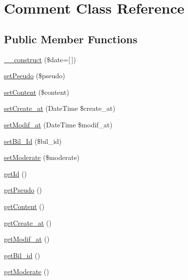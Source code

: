 \hypertarget{class_src_1_1_entity_1_1_comment}{}\section{Comment Class Reference}
\label{class_src_1_1_entity_1_1_comment}
\subsection*{Public Member Functions}
\begin{DoxyCompactItemize}
\item 
\hyperlink{class_src_1_1_entity_1_1_comment_a594620c0e8c7693172eee4901c0b7705}{\+\_\+\+\_\+construct} (\$date=\mbox{[}$\,$\mbox{]})
\item 
\hyperlink{class_src_1_1_entity_1_1_comment_a1d65ce1d25ffb871a48d33715e6b6bef}{set\+Pseudo} (\$pseudo)
\item 
\hyperlink{class_src_1_1_entity_1_1_comment_a04a5eddb7c3abc7bf31fa25b58f046bf}{set\+Content} (\$content)
\item 
\hyperlink{class_src_1_1_entity_1_1_comment_ad12db04fd7abd82e8172ebee19c45ff1}{set\+Create\+\_\+at} (Date\+Time \$create\+\_\+at)
\item 
\hyperlink{class_src_1_1_entity_1_1_comment_a9f9f5983de6ae197176a80f55f113a6c}{set\+Modif\+\_\+at} (Date\+Time \$modif\+\_\+at)
\item 
\hyperlink{class_src_1_1_entity_1_1_comment_a2e409e601842718df8e3fb392a6553a2}{set\+Bil\+\_\+\+Id} (\$bil\+\_\+id)
\item 
\hyperlink{class_src_1_1_entity_1_1_comment_a0067c44a7d1de40089ffed311672b328}{set\+Moderate} (\$moderate)
\item 
\hyperlink{class_src_1_1_entity_1_1_comment_a12251d0c022e9e21c137a105ff683f13}{get\+Id} ()
\item 
\hyperlink{class_src_1_1_entity_1_1_comment_a7151e41f7b522d26d02102d970e9a309}{get\+Pseudo} ()
\item 
\hyperlink{class_src_1_1_entity_1_1_comment_a58e43f09a06ce4e29b192c4e17ce7915}{get\+Content} ()
\item 
\hyperlink{class_src_1_1_entity_1_1_comment_ae5e6c0bedcef3f514100c20ee92c901a}{get\+Create\+\_\+at} ()
\item 
\hyperlink{class_src_1_1_entity_1_1_comment_a5858386cc69be9863ed37e0ceb2697b1}{get\+Modif\+\_\+at} ()
\item 
\hyperlink{class_src_1_1_entity_1_1_comment_a1df6ee009c81d0d807d36d18d40b9e97}{get\+Bil\+\_\+id} ()
\item 
\hyperlink{class_src_1_1_entity_1_1_comment_a6d3a6a148bf0c8752548e7e7ab149abb}{get\+Moderate} ()
\end{DoxyCompactItemize}


